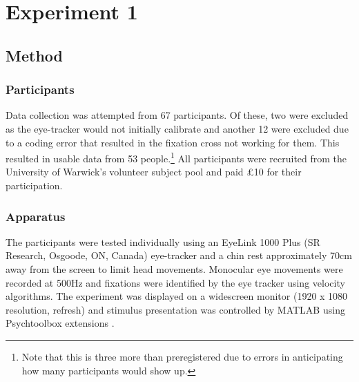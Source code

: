 \documentclass[doc, a4paper, apacite]{apa6}
\begin{document}


\section{Experiment 1} \label{exp:NS01} 
\subsection{Method}
\subsubsection{Participants}
Data collection was attempted from 67 participants. Of these, two were excluded as the eye-tracker would not initially calibrate and another 12 were excluded due to a coding error that resulted in the fixation cross not working for them. This resulted in usable data from 53 people.\footnote{Note that this is three more than preregistered due to errors in anticipating how many participants would show up.} All participants were recruited from the University of Warwick's volunteer subject pool and paid \pounds10 for their participation.

\subsubsection{Apparatus}
The participants were tested individually using an EyeLink 1000 Plus (SR Research, Osgoode, ON, Canada) eye-tracker and a chin rest approximately 70cm away from the screen to limit head movements. Monocular eye movements were recorded at 500Hz and fixations were identified by the eye tracker using velocity algorithms. The experiment was displayed on a widescreen monitor (1920 x 1080 resolution, refresh) and stimulus presentation was controlled by MATLAB using Psychtoolbox extensions \cite{Brainard1997, Pelli1997}.
\end{document}
